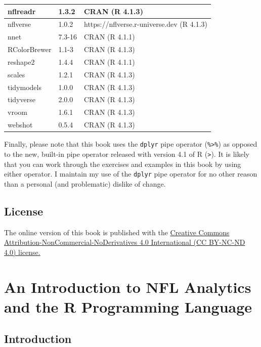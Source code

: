 \documentclass[
  letterpaper,
]{krantz}
\begin{document}
\begin{table}
\begin{tabular}[t]{l|l|l}
\hline
nflreadr & 1.3.2 & CRAN (R 4.1.3)\\
\hline
nflverse & 1.0.2 & https://nflverse.r-universe.dev (R 4.1.3)\\
\hline
nnet & 7.3-16 & CRAN (R 4.1.1)\\
\hline
RColorBrewer & 1.1-3 & CRAN (R 4.1.3)\\
\hline
reshape2 & 1.4.4 & CRAN (R 4.1.1)\\
\hline
scales & 1.2.1 & CRAN (R 4.1.3)\\
\hline
tidymodels & 1.0.0 & CRAN (R 4.1.3)\\
\hline
tidyverse & 2.0.0 & CRAN (R 4.1.3)\\
\hline
vroom & 1.6.1 & CRAN (R 4.1.3)\\
\hline
webshot & 0.5.4 & CRAN (R 4.1.3)\\
\hline
\end{tabular}
\end{table}

Finally, please note that this book uses the \texttt{dplyr} pipe
operator (\texttt{\%\textgreater{}\%}) as opposed to the new, built-in
pipe operator released with version 4.1 of R
(\texttt{\textbar{}\textgreater{}}). It is likely that you can work
through the exercises and examples in this book by using either
operator. I maintain my use of the \texttt{dplyr} pipe operator for no
other reason than a personal (and problematic) dislike of change.

\hypertarget{license}{%
\section{License}\label{license}}

The online version of this book is published with the
\href{https://creativecommons.org/licenses/by-nc-nd/4.0/}{Creative
Commons Attribution-NonCommercial-NoDerivatives 4.0 International (CC
BY-NC-ND 4.0) license.}


\hypertarget{an-introduction-to-nfl-analytics-and-the-r-programming-language}{%
\chapter{An Introduction to NFL Analytics and the R Programming
Language}\label{an-introduction-to-nfl-analytics-and-the-r-programming-language}}

\hypertarget{introduction-1}{%
\section{Introduction}\label{introduction-1}}
\end{document}
